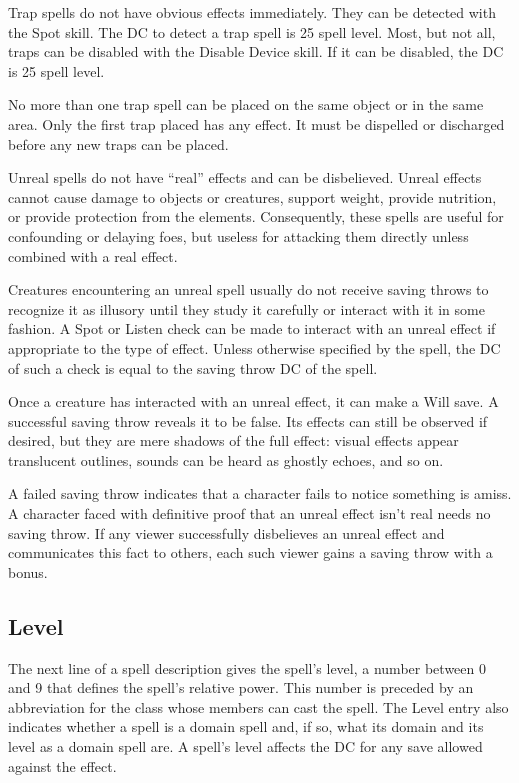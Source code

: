 \begin{itemize*}
\item Trap spells do not have obvious effects immediately. They can be detected with the Spot skill. The DC to detect a trap spell is 25 \add spell level. Most, but not all, traps can be disabled with the Disable Device skill. If it can be disabled, the DC is 25 \add spell level.
\par No more than one trap spell can be placed on the same object or in the same area. Only the first trap placed has any effect. It must be dispelled or discharged before any new traps can be placed.
\item Unreal spells do not have ``real'' effects and can be disbelieved. Unreal effects cannot cause damage to objects or creatures, support weight, provide nutrition, or provide protection from the elements. Consequently, these spells are useful for confounding or delaying foes, but useless for attacking them directly unless combined with a real effect.
\par Creatures encountering an unreal spell usually do not receive saving throws to recognize it as illusory until they study it carefully or interact with it in some fashion. A Spot or Listen check can be made to interact with an unreal effect if appropriate to the type of effect. Unless otherwise specified by the spell, the DC of such a check is equal to the saving throw DC of the spell.
\par Once a creature has interacted with an unreal effect, it can make a Will save. A successful saving throw reveals it to be false. Its effects can still be observed if desired, but they are mere shadows of the full effect: visual effects appear translucent outlines, sounds can be heard as ghostly echoes, and so on.
\par A failed saving throw indicates that a character fails to notice something is amiss. A character faced with definitive proof that an unreal effect isn't real needs no saving throw. If any viewer successfully disbelieves an unreal effect and communicates this fact to others, each such viewer gains a saving throw with a  bonus.
\end{itemize*}

\subsection{Level}
The next line of a spell description gives the spell's level, a number between 0 and 9 that defines the spell's relative power. This number is preceded by an abbreviation for the class whose members can cast the spell. The Level entry also indicates whether a spell is a domain spell and, if so, what its domain and its level as a domain spell are. A spell's level affects the DC for any save allowed against the effect.

